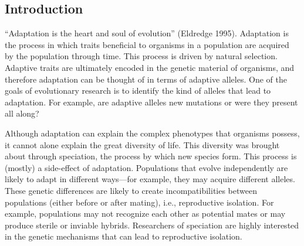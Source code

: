 \begin{doublespace}

\chapter*{Introduction}



``Adaptation is the heart and soul of evolution'' (Eldredge 1995).
%
Adaptation is the process in which traits beneficial to organisms
in a population are acquired by the population through time.
%
This process is driven by natural selection.
%
Adaptive traits are ultimately encoded in the genetic material of organisms,
and therefore adaptation can be thought of in terms of adaptive alleles.
%
One of the goals of evolutionary research is to identify
the kind of alleles that lead to adaptation.
%
For example, are adaptive alleles new mutations or were they present all along?



Although adaptation can explain the complex phenotypes that organisms possess,
it cannot alone explain the great diversity of life.
%
This diversity was brought about through speciation,
the process by which new species form.
%
This process is (mostly) a side-effect of adaptation.
%
Populations that evolve independently are likely to adapt
in different ways---for example, they may acquire different alleles.
%
These genetic differences are likely to create incompatibilities
between populations (either before or after mating),
i.e., reproductive isolation.
%
For example, populations may not recognize each other as potential mates
or may produce sterile or inviable hybrids.
%
Researchers of speciation are highly interested
in the genetic mechanisms that can lead to reproductive isolation.




\end{doublespace}
